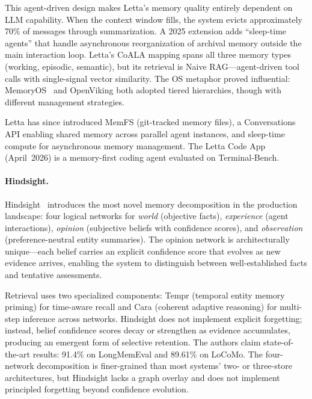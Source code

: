 This agent-driven design makes Letta's memory quality entirely
dependent on LLM capability. When the context window fills, the
system evicts approximately 70\% of messages through summarization.
A 2025 extension adds ``sleep-time agents'' that handle asynchronous
reorganization of archival memory outside the main interaction loop.
Letta's CoALA mapping spans all three memory types (working, episodic,
semantic), but its retrieval is Naive RAG---agent-driven tool calls
with single-signal vector similarity. The OS metaphor proved
influential: MemoryOS~\cite{kang2025memoryos} and OpenViking both
adopted tiered hierarchies, though with different management
strategies.

Letta has since introduced MemFS (git-tracked memory files), a
Conversations API enabling shared memory across parallel agent
instances, and sleep-time compute for asynchronous memory management.
The Letta Code App (April~2026) is a memory-first coding agent
evaluated on Terminal-Bench.

\paragraph{Hindsight.}
Hindsight~\cite{latimer2025hindsight} introduces the most novel memory
decomposition in the production landscape: four logical networks for
\emph{world} (objective facts), \emph{experience} (agent
interactions), \emph{opinion} (subjective beliefs with confidence
scores), and \emph{observation} (preference-neutral entity summaries).
The opinion network is architecturally unique---each belief carries an
explicit confidence score that evolves as new evidence arrives,
enabling the system to distinguish between well-established facts and
tentative assessments.

Retrieval uses two specialized components: Tempr (temporal entity
memory priming) for time-aware recall and Cara (coherent adaptive
reasoning) for multi-step inference across networks. Hindsight does
not implement explicit forgetting; instead, belief confidence scores
decay or strengthen as evidence accumulates, producing an emergent
form of selective retention. The authors claim state-of-the-art
results: 91.4\% on LongMemEval and 89.61\% on LoCoMo. The four-network
decomposition is finer-grained than most systems' two- or three-store
architectures, but Hindsight lacks a graph overlay and does not
implement principled forgetting beyond confidence evolution.

